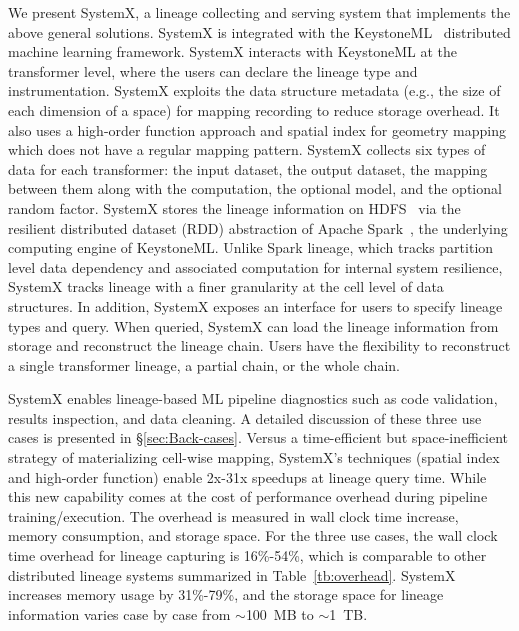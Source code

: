 \documentclass{sig-alternate}
\begin{document}
We present SystemX, a lineage collecting and serving system that implements the above general solutions.
SystemX is integrated with the KeystoneML~\cite{sparks15} distributed machine learning framework.
SystemX interacts with KeystoneML at the transformer level, where the users can declare the lineage type and instrumentation.
SystemX exploits the  data structure metadata (e.g., the size of each dimension of a space) for mapping recording to reduce storage overhead.
It also uses a high-order function approach and spatial index for geometry mapping which does not have a regular mapping pattern.
SystemX collects six types of data for each transformer: the input dataset, the output dataset, the mapping between them
along with the computation, the optional model, and the optional random factor.
SystemX stores the lineage information on HDFS~\cite{shvachko10} via the resilient distributed dataset (RDD) abstraction
of Apache Spark~\cite{zaharia12}, the underlying computing engine of KeystoneML.
Unlike Spark lineage, which tracks partition level data dependency and associated computation for internal system resilience,
SystemX tracks lineage with a finer granularity at the cell level of data structures.
In addition, SystemX exposes an interface for users to specify lineage types and query.
When queried, SystemX can load the lineage information from storage and reconstruct the lineage chain.
Users have the flexibility to reconstruct a single transformer lineage, a partial chain, or the whole chain.

SystemX enables lineage-based ML pipeline diagnostics such as code validation, results inspection, and data cleaning.
A detailed discussion of these three use cases is presented in \S\ref{sec:Back-cases}.
Versus a time-efficient but space-inefficient strategy of materializing cell-wise mapping, 
SystemX's techniques (spatial index and high-order function) enable 2x-31x speedups at lineage query time.
While this new capability comes at the cost of performance overhead during pipeline training/execution.
The overhead is measured in wall clock time increase, memory consumption, and storage space.
For the three use cases, the wall clock time overhead for lineage capturing is 16\%-54\%, which is comparable to other distributed lineage systems
summarized in Table~\ref{tb:overhead}.
SystemX increases memory usage by 31\%-79\%,
and the storage space for lineage information varies case by case from $\sim$100~MB to $\sim$1~TB.
\end{document}
